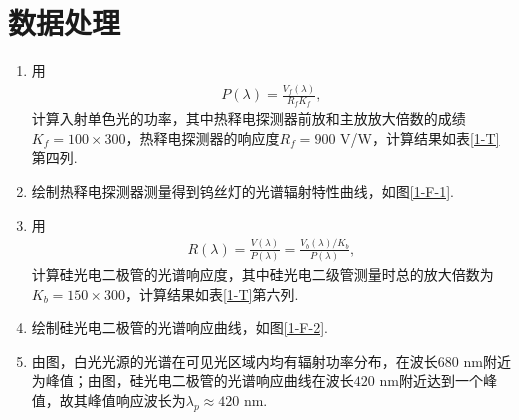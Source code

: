\documentclass[UTF8,10pt,a4paper]{article}
\begin{document}
\section{数据处理}
\begin{enumerate}
    \item 用
    \begin{align}
        P(\lambda)=\frac{V_f(\lambda)}{R_fK_f},
    \end{align}
    计算入射单色光的功率，其中热释电探测器前放和主放放大倍数的成绩$K_f=100\times 300$，热释电探测器的响应度$R_f=900$ V/W，计算结果如表\ref{1-T}第四列.
    \item 绘制热释电探测器测量得到钨丝灯的光谱辐射特性曲线，如图\ref{1-F-1}.
    \item 用
    \begin{align}
        R(\lambda)=\frac{V(\lambda)}{P(\lambda)}=\frac{V_b(\lambda)/K_b}{P(\lambda)},
    \end{align}
    计算硅光电二极管的光谱响应度，其中硅光电二级管测量时总的放大倍数为$K_b=150\times 300$，计算结果如表\ref{1-T}第六列.
    \item 绘制硅光电二极管的光谱响应曲线，如图\ref{1-F-2}.
    \item 由图，白光光源的光谱在可见光区域内均有辐射功率分布，在波长$680$ nm附近为峰值；由图，硅光电二极管的光谱响应曲线在波长$420$ nm附近达到一个峰值，故其峰值响应波长为$\lambda_p\approx 420$ nm.
\end{enumerate}
\end{document}
